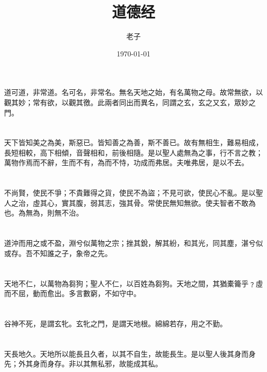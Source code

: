 \documentclass[11pt,oneside]{article}
\author{老子}
\date{\today}
\title{道德经}
\begin{document}
\maketitle

\section{}
\label{sec:orgheadline1}
道可道，非常道。名可名，非常名。無名天地之始，有名萬物之母。故常無欲，以觀其妙；常有欲，以觀其徼。此兩者同出而異名，同謂之玄，玄之又玄，眾妙之門。

\section{}
\label{sec:orgheadline2}
天下皆知美之為美，斯惡已。皆知善之為善，斯不善已。故有無相生，難易相成，長短相較，高下相傾，音聲相和，前後相隨。是以聖人處無為之事，行不言之教；萬物作焉而不辭，生而不有，為而不恃，功成而弗居。夫唯弗居，是以不去。

\section{}
\label{sec:orgheadline3}
不尚賢，使民不爭；不貴難得之貨，使民不為盜；不見可欲，使民心不亂。是以聖人之治，虛其心，實其腹，弱其志，強其骨。常使民無知無欲。使夫智者不敢為也。為無為，則無不治。

\section{}
\label{sec:orgheadline4}
道沖而用之或不盈，淵兮似萬物之宗；挫其銳，解其紛，和其光，同其塵，湛兮似或存。吾不知誰之子，象帝之先。

\section{}
\label{sec:orgheadline5}
天地不仁，以萬物為芻狗；聖人不仁，以百姓為芻狗。天地之間，其猶橐籥乎﹖虛而不屈，動而愈出。多言數窮，不如守中。

\section{}
\label{sec:orgheadline6}
谷神不死，是謂玄牝。玄牝之門，是謂天地根。綿綿若存，用之不勤。

\section{}
\label{sec:orgheadline7}
天長地久。天地所以能長且久者，以其不自生，故能長生。是以聖人後其身而身先；外其身而身存。非以其無私邪，故能成其私。
\end{document}
